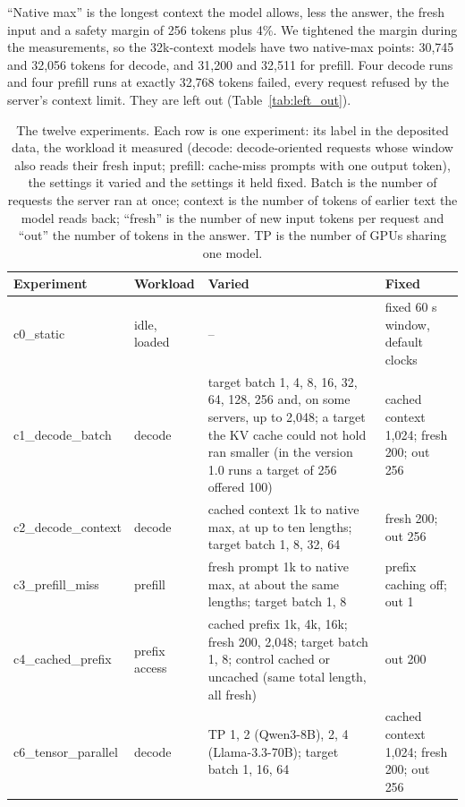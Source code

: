 \documentclass[11pt]{article}
\begin{document}
``Native max'' is the longest context the model allows, less the answer, the fresh input and a safety margin of 256 tokens plus 4\%. We tightened the margin during the measurements, so the 32k-context models have two native-max points: 30,745 and 32,056 tokens for decode, and 31,200 and 32,511 for prefill. Four decode runs and four prefill runs at exactly 32,768 tokens failed, every request refused by the server's context limit. They are left out (Table~\ref{tab:left_out}).

\begin{table}[h]
\centering
\caption{The twelve experiments. Each row is one experiment: its label in the deposited data, the workload it measured (decode: decode-oriented requests whose window also reads their fresh input; prefill: cache-miss prompts with one output token), the settings it varied and the settings it held fixed. Batch is the number of requests the server ran at once; context is the number of tokens of earlier text the model reads back; ``fresh'' is the number of new input tokens per request and ``out'' the number of tokens in the answer. TP is the number of GPUs sharing one model.}\label{tab:cells}
\begin{footnotesize}
\setlength{\tabcolsep}{4pt}
\begin{tabular}{ll>{\raggedright\arraybackslash}p{5.45cm}>{\raggedright\arraybackslash}p{3.6cm}}
\toprule
Experiment & Workload & Varied & Fixed \\
\midrule
c0\_static & idle, loaded & -- & fixed 60 s window, default clocks \\
c1\_decode\_batch & decode & target batch 1, 4, 8, 16, 32, 64, 128, 256 and, on some servers, up to 2,048; a target the KV cache could not hold ran smaller (in the version 1.0 runs a target of 256 offered 100) & cached context 1,024; fresh 200; out 256 \\
c2\_decode\_context & decode & cached context 1k to native max, at up to ten lengths; target batch 1, 8, 32, 64 & fresh 200; out 256 \\
c3\_prefill\_miss & prefill & fresh prompt 1k to native max, at about the same lengths; target batch 1, 8 & prefix caching off; out 1 \\
c4\_cached\_prefix & prefix access & cached prefix 1k, 4k, 16k; fresh 200, 2,048; target batch 1, 8; control cached or uncached (same total length, all fresh) & out 200 \\
c6\_tensor\_parallel & decode & TP 1, 2 (Qwen3-8B), 2, 4 (Llama-3.3-70B); target batch 1, 16, 64 & cached context 1,024; fresh 200; out 256 \\

\end{tabular}
\end{footnotesize}
\end{table}
\end{document}
